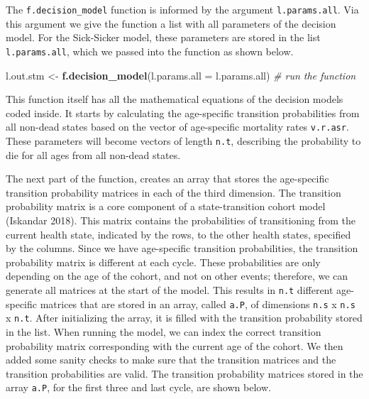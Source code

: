 \documentclass[]{article}
\newenvironment{Shaded}{\begin{snugshade}}{\end{snugshade}}
\newcommand{\KeywordTok}[1]{\textcolor[rgb]{0.13,0.29,0.53}{\textbf{#1}}}
\newcommand{\DataTypeTok}[1]{\textcolor[rgb]{0.13,0.29,0.53}{#1}}
\newcommand{\DecValTok}[1]{\textcolor[rgb]{0.00,0.00,0.81}{#1}}
\newcommand{\StringTok}[1]{\textcolor[rgb]{0.31,0.60,0.02}{#1}}
\newcommand{\CommentTok}[1]{\textcolor[rgb]{0.56,0.35,0.01}{\textit{#1}}}
\newcommand{\OperatorTok}[1]{\textcolor[rgb]{0.81,0.36,0.00}{\textbf{#1}}}
\newcommand{\NormalTok}[1]{#1}
\begin{document}
The \texttt{f.decision\_model} function is informed by the argument
\texttt{l.params.all}. Via this argument we give the function a list
with all parameters of the decision model. For the Sick-Sicker model,
these parameters are stored in the list \texttt{l.params.all}, which we
passed into the function as shown below.

\begin{Shaded}
\begin{Highlighting}[]
\NormalTok{l.out.stm <-}\StringTok{ }\KeywordTok{f.decision_model}\NormalTok{(}\DataTypeTok{l.params.all =}\NormalTok{ l.params.all) }\CommentTok{# run the function}
\end{Highlighting}
\end{Shaded}

This function itself has all the mathematical equations of the decision
models coded inside. It starts by calculating the age-specific
transition probabilities from all non-dead states based on the vector of
age-specific mortality rates \texttt{v.r.asr}. These parameters will
become vectors of length \texttt{n.t}, describing the probability to die
for all ages from all non-dead states.

The next part of the function, creates an array that stores the
age-specific transition probability matrices in each of the third
dimension. The transition probability matrix is a core component of a
state-transition cohort model (Iskandar 2018). This matrix contains the
probabilities of transitioning from the current health state, indicated
by the rows, to the other health states, specified by the columns. Since
we have age-specific transition probabilities, the transition
probability matrix is different at each cycle. These probabilities are
only depending on the age of the cohort, and not on other events;
therefore, we can generate all matrices at the start of the model. This
results in \texttt{n.t} different age-specific matrices that are stored
in an array, called \texttt{a.P}, of dimensions \texttt{n.s} x
\texttt{n.s} x \texttt{n.t}. After initializing the array, it is filled
with the transition probability stored in the list. When running the
model, we can index the correct transition probability matrix
corresponding with the current age of the cohort. We then added some
sanity checks to make sure that the transition matrices and the
transition probabilities are valid. The transition probability matrices
stored in the array \texttt{a.P}, for the first three and last cycle,
are shown below.

\begin{Shaded}
\end{Shaded}
\end{document}
